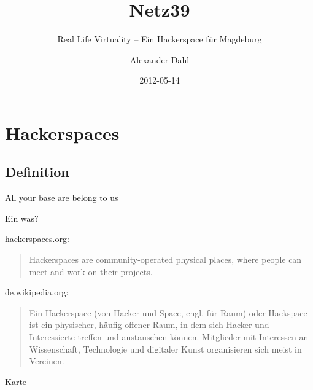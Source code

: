 \documentclass{beamer}
\title[Netz39]{Netz39}
\subtitle{Real Life Virtuality -- Ein Hackerspace für Magdeburg}
\author{Alexander Dahl}
\institute[netz39.de]{\url{http://www.netz39.de/}}
\date{2012-05-14}
\begin{document}
\begin{frame}
	\titlepage
\end{frame}


\section{Hackerspaces}

\subsection{Definition}

\begin{frame}[label=secinvaders]{All your base are belong to us}
    \begin{figure}
    \end{figure}
\end{frame}

\begin{frame}{Ein was?}
    \begin{block}{hackerspaces.org:}
        \begin{quote}
            Hackerspaces are community-operated physical places, where 
            people can meet and work on their projects.
        \end{quote}
    \end{block}
    \pause
    \begin{block}{de.wikipedia.org:}
        \begin{quote}
            Ein Hackerspace (von Hacker und Space, engl. für Raum) oder
            Hackspace ist ein physischer, häufig offener Raum, in dem 
            sich Hacker und Interessierte treffen und austauschen 
            können. Mitglieder mit Interessen an Wissenschaft, 
            Technologie und digitaler Kunst organisieren sich meist in 
            Vereinen.
        \end{quote}
    \end{block}
\end{frame}

\begin{frame}[label=secmap]{Karte}
    \begin{figure}
    \end{figure}
\end{frame}
\end{document}
